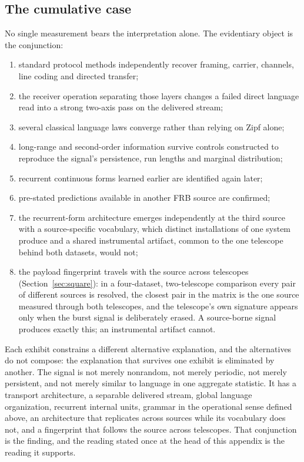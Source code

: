 \documentclass[11pt,a4paper]{article}
\begin{document}
\subsection{The cumulative case}

No single measurement bears the interpretation alone. The evidentiary object is the
conjunction:

\begin{enumerate}[leftmargin=1.6em,itemsep=3pt]
\item standard protocol methods independently recover framing, carrier, channels, line
coding and directed transfer;
\item the receiver operation separating those layers changes a failed direct language
read into a strong two-axis pass on the delivered stream;
\item several classical language laws converge rather than relying on Zipf alone;
\item long-range and second-order information survive controls constructed to reproduce
the signal's persistence, run lengths and marginal distribution;
\item recurrent continuous forms learned earlier are identified again later;
\item pre-stated predictions available in another FRB source are confirmed;
\item the recurrent-form architecture emerges independently at the third source with
a source-specific vocabulary, which distinct installations of one system produce and
a shared instrumental artifact, common to the one telescope behind both datasets,
would not;
\item the payload fingerprint travels with the source across telescopes
(Section~\ref{sec:square}): in a four-dataset, two-telescope comparison every pair of
different sources is resolved, the closest pair in the matrix is the one source
measured through both telescopes, and the telescope's own signature appears only when
the burst signal is deliberately erased. A source-borne signal produces exactly this;
an instrumental artifact cannot.
\end{enumerate}

Each exhibit constrains a different alternative explanation, and the alternatives do
not compose: the explanation that survives one exhibit is eliminated by another. The
signal is not merely nonrandom, not merely periodic, not merely persistent, and not
merely similar to language in one aggregate statistic. It has a transport
architecture, a separable delivered stream, global language organization, recurrent
internal units, grammar in the operational sense defined above, an architecture
that replicates across sources while its vocabulary does not, and a fingerprint that
follows the source across telescopes. That conjunction is
the finding, and the reading stated once at the head of this appendix is the reading
it supports.
\end{document}
